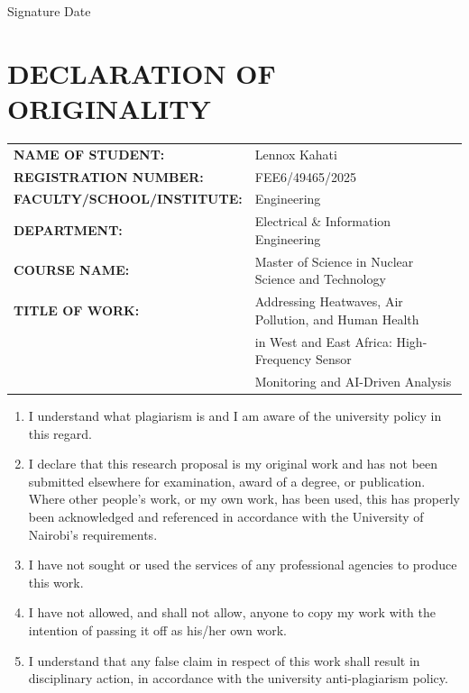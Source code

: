 \documentclass[12pt,a4paper]{report}
\newcommand{\sigline}[1][6cm]{\underline{\hspace{#1}}}
\begin{document}
\vspace{0.5cm}
\noindent
Signature \sigline[7cm]\quad Date \sigline[4cm]

\chapter*{DECLARATION OF ORIGINALITY}

\begin{tabular}{@{}ll}
\textbf{NAME OF STUDENT:}          & Lennox Kahati \\[4pt]
\textbf{REGISTRATION NUMBER:}      & FEE6/49465/2025 \\[4pt]
\textbf{FACULTY/SCHOOL/INSTITUTE:} & Engineering \\[4pt]
\textbf{DEPARTMENT:}               & Electrical \& Information Engineering \\[4pt]
\textbf{COURSE NAME:}              & Master of Science in Nuclear Science and Technology \\[4pt]
\textbf{TITLE OF WORK:}            & Addressing Heatwaves, Air Pollution, and Human Health \\
                                   & in West and East Africa: High-Frequency Sensor \\
                                   & Monitoring and AI-Driven Analysis \\
\end{tabular}

\vspace{1cm}
\begin{enumerate}[leftmargin=*, label=\arabic*.]
  \item I understand what plagiarism is and I am aware of the university policy in this regard.
  \item I declare that this research proposal is my original work and has not been submitted elsewhere for examination, award of a degree, or publication. Where other people's work, or my own work, has been used, this has properly been acknowledged and referenced in accordance with the University of Nairobi's requirements.
  \item I have not sought or used the services of any professional agencies to produce this work.
  \item I have not allowed, and shall not allow, anyone to copy my work with the intention of passing it off as his/her own work.
  \item I understand that any false claim in respect of this work shall result in disciplinary action, in accordance with the university anti-plagiarism policy.
\end{enumerate}
\end{document}

